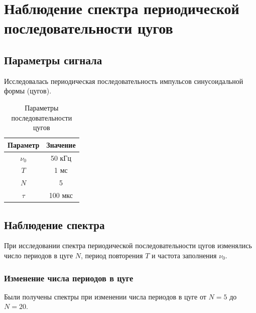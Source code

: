 \documentclass[14pt,a4paper]{extarticle}
\begin{document}
\section{Наблюдение спектра периодической последовательности цугов}

\subsection{Параметры сигнала}

Исследовалась периодическая последовательность импульсов синусоидальной
формы (цугов).


\begin{table}[H]
\centering
\caption{Параметры последовательности цугов}
\begin{tabular}{|c|c|}
\hline
Параметр & Значение \\
\hline
$\nu_0$ & 50 кГц\\
\hline
$T$ & 1 мс\\
\hline
$N$ & 5\\
\hline
$\tau$ & 100 мкс\\
\hline
\end{tabular}
\end{table}

\subsection{Наблюдение спектра}

При исследовании спектра периодической последовательности цугов
изменялись число периодов в цуге $N$, период повторения $T$ и частота
заполнения $\nu_0$.

\newpage

\subsubsection*{Изменение числа периодов в цуге}

Были получены спектры при изменении числа периодов в цуге
от $N=5$ до $N=20$.
\end{document}
